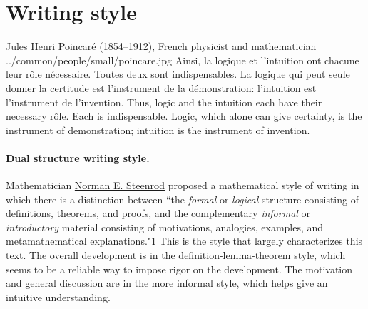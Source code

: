 \section*{Writing style}
\qboxnpqt
  { %
    \href{http://en.wikipedia.org/wiki/Henri_Poincar\%C3\%A9}{Jules Henri Poincar\'e} 
    \href{http://www-history.mcs.st-andrews.ac.uk/Timelines/TimelineF.html}{(1854--1912)}, 
    \href{http://www-history.mcs.st-andrews.ac.uk/BirthplaceMaps/Places/France.html}{French physicist and mathematician}
    \footnotemark
  }
  {../common/people/small/poincare.jpg}
  {Ainsi, la logique et l'intuition ont chacune leur r\^ole n\'ecessaire.
    Toutes deux sont indispensables.
    La logique qui peut seule donner la certitude est l'instrument de la d\'emonstration:
    l'intuition est l'instrument de l'invention.}
  {Thus, logic and the intuition each have their necessary r\^ole.
    Each is indispensable.
    Logic, which alone can give certainty, is the instrument of demonstration;
    intuition is the instrument of invention.}

  \paragraph{Dual structure writing style.}
  Mathematician \href{http://en.wikipedia.org/wiki/Steenrod}{Norman E. Steenrod}
  proposed a mathematical style of writing
  in which there is a distinction between
  ``the {\em formal} or {\em logical} structure consisting of definitions, theorems,
  and proofs, and the complementary
  {\em informal} or {\em introductory} material consisting of motivations, analogies,
  examples, and metamathematical explanations."\citep{steenrod}{1}
  This is the style that largely characterizes this text.
  The overall development is in the definition-lemma-theorem style,
  which seems to be a reliable way to impose rigor on the development.
  The motivation and general discussion are in the more informal style,
  which helps give an intuitive understanding.

